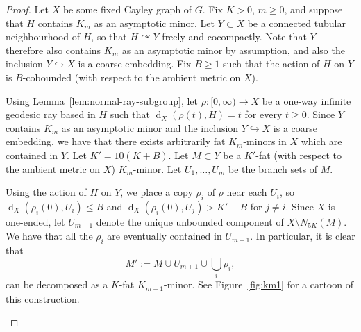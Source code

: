 \documentclass[10pt,a4paper]{amsart}
\DeclareMathOperator{\dist}{d}
\newcommand{\into}{\hookrightarrow}
\newcommand{\actson}{\curvearrowright}
\theoremstyle{definition}
\begin{document}
\begin{proof}
	Let $X$ be some fixed Cayley graph of $G$. 
	Fix $K > 0$, $m \geq 0$, and suppose that $H$ contains $K_m$ as an asymptotic minor. 
    Let $Y \subset X$ be a connected tubular neighbourhood of $H$, so that $H \actson Y$ freely and cocompactly. Note that $Y$ therefore also contains $K_m$ as an asymptotic minor by assumption, and also the inclusion $Y \into X$ is a coarse embedding. 
    Fix $B \geq 1$ such that the action of $H$ on $Y$ is $B$-cobounded (with respect to the ambient metric on $X$). 
    
    Using Lemma~\ref{lem:normal-ray-subgroup}, let $\rho : [0, \infty) \to X$ be a one-way infinite geodesic ray based in $H$ such that $\dist_X(\rho(t), H) = t$ for every $t \geq 0$. 
    Since $Y$ contains $K_m$ as an asymptotic minor and the inclusion $Y \into X$ is a coarse embedding, we have that there exists arbitrarily fat $K_m$-minors in $X$ which are contained in $Y$. Let $K' = 10(K+B)$. Let $M \subset Y$ be a $K'$-fat (with respect to the ambient metric on $X$) $K_m$-minor. Let $U_1, \ldots, U_m$ be the branch sets of $M$. 

    Using the action of $H$ on $Y$, we place a copy $\rho_i$ of $\rho$ near each $U_i$, so $\dist_X(\rho_i(0), U_i) \leq B$ and  $\dist_X(\rho_i(0), U_j) > K'-B$ for $j \neq i$. 
    Since $X$ is one-ended, let 
    $
    U_{m+1}$ denote the unique unbounded component of $X \setminus N_{5K}(M). 
    $
    We have that all the $\rho_i$ are eventually contained in $U_{m+1}$. In particular, it is clear that 
    $$
    M' :=  M \cup U_{m+1} \cup \bigcup_i \rho_i,
    $$
    can be decomposed as a $K$-fat $K_{m+1}$-minor. See Figure~\ref{fig:km1} for a cartoon of this construction.
\begin{figure}
    \centering
    
    

\begin{tikzpicture}[x=0.75pt,y=0.75pt,yscale=-1,xscale=1]



\end{tikzpicture}
\end{figure}
\end{proof}
\end{document}
